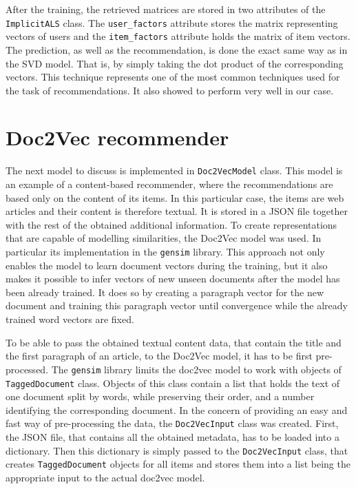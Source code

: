 After the training, the retrieved matrices are stored in two attributes of the \texttt{ImplicitALS} class. The \texttt{user\_factors} attribute stores the matrix representing vectors of users and the \texttt{item\_factors} attribute holds the matrix of item vectors. The prediction, as well as the recommendation, is done the exact same way as in the SVD model. That is, by simply taking the dot product of the corresponding vectors. This technique represents one of the most common techniques used for the task of recommendations. It also showed to perform very well in our case.

\section{Doc2Vec recommender} \label{doc2vec_implementation}
The next model to discuss is implemented in \texttt{Doc2VecModel} class. This model is an example of a content-based recommender, where the recommendations are based only on the content of its items. In this particular case, the items are web articles and their content is therefore textual. It is stored in a JSON file together with the rest of the obtained additional information. To create representations that are capable of modelling similarities, the Doc2Vec model was used. In particular its implementation in the \texttt{gensim} library. This approach not only enables the model to learn document vectors during the training, but it also makes it possible to infer vectors of new unseen documents after the model has been already trained. It does so by creating a paragraph vector for the new document and training this paragraph vector until convergence while the already trained word vectors are fixed.

To be able to pass the obtained textual content data, that contain the title and the first paragraph of an article, to the Doc2Vec model, it has to be first pre-processed. The \texttt{gensim} library limits the doc2vec model to work with objects of \texttt{TaggedDocument} class. Objects of this class contain a list that holds the text of one document split by words, while preserving their order,  and a number identifying the corresponding document. In the concern of providing an easy and fast way of pre-processing the data, the \texttt{Doc2VecInput} class was created. First, the JSON file, that contains all the obtained metadata, has to be loaded into a dictionary. Then this dictionary is simply passed to the \texttt{Doc2VecInput} class, that creates \texttt{TaggedDocument} objects for all items and stores them into a list being the appropriate input to the actual doc2vec model.

